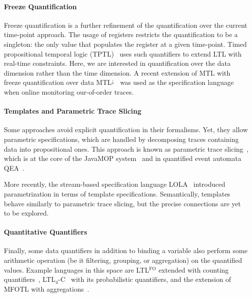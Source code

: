 \documentclass{article}
\begin{document}
\paragraph{Freeze Quantification}

Freeze quantification is a further refinement of the quantification over the current time-point approach. The usage of registers restricts the quantification to be a singleton: the only value that populates the register at a given time-point.
Timed propositional temporal logic (TPTL)~\cite{AlurH94} uses such quantifiers to extend LTL with real-time constraints. Here, we are interested in quantification over the data dimension rather than the time dimension. A recent extension of MTL with freeze quantification over data MTL$^\downarrow$~\cite{BasinKZ17} was used as the specification language when online monitoring our-of-order traces.

\paragraph{Templates and Parametric Trace Slicing}

Some approaches avoid explicit quantification in their formalisms. Yet, they allow parametric specifications, which are handled by decomposing traces containing data into propositional ones. This approach is known as parametric trace slicing~\cite{ChenR09,RegerR15}, which is at the core of the JavaMOP system~\cite{MeredithJGCR12} and in quantified event automata 
QEA~\cite{BarringerFHRR12}.

More recently, the stream-based specification language LOLA~\cite{FaymonvilleFST16} introduced parametrization in terms of template specifications. Semantically, templates behave similarly to parametric trace slicing, but the precise connections are yet to be explored.

\paragraph{Quantitative Quantifiers}

Finally, some data quantifiers in addition to binding a variable also perform some arithmetic operation (be it filtering, grouping, or aggregation) on the quantified values.
Example languages in this space are
LTL$^{\text{FO}}$ extended with counting quantifiers~\cite{BauerGT09},
LTL$_4$-C~\cite{MedhatBFJ16} with its probabilistic quantifiers, and the extension of MFOTL with aggregations~\cite{BasinKMZ15}.



\end{document}
